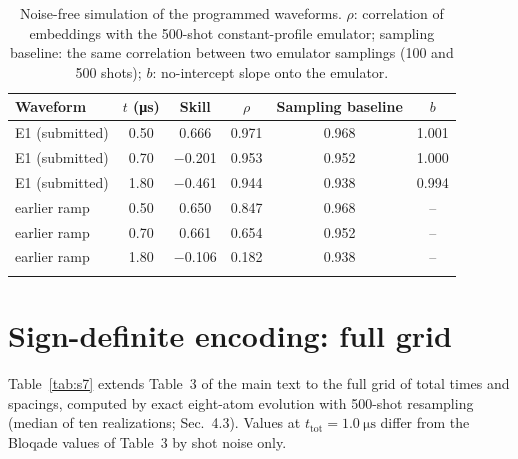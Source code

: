 \documentclass[pdflatex,sn-mathphys-num]{sn-jnl}
\begin{document}
\begin{table}[htb]
\caption{Noise-free simulation of the programmed waveforms. $\rho$: correlation of embeddings with the 500-shot constant-profile emulator; sampling baseline: the same correlation between two emulator samplings (100 and 500 shots); $b$: no-intercept slope onto the emulator.}\label{tab:s6}
\begin{tabular}{@{}lccccc@{}}
\toprule
Waveform & $t$ (\si{\micro\second}) & Skill & $\rho$ & Sampling baseline & $b$ \\
\midrule
E1 (submitted) & 0.50 & 0.666 & 0.971 & 0.968 & 1.001 \\
E1 (submitted) & 0.70 & $-$0.201 & 0.953 & 0.952 & 1.000 \\
E1 (submitted) & 1.80 & $-$0.461 & 0.944 & 0.938 & 0.994 \\
earlier ramp & 0.50 & 0.650 & 0.847 & 0.968 & -- \\
earlier ramp & 0.70 & 0.661 & 0.654 & 0.952 & -- \\
earlier ramp & 1.80 & $-$0.106 & 0.182 & 0.938 & -- \\
\botrule
\end{tabular}
\end{table}

\section{Sign-definite encoding: full grid}\label{sec:s7}

Table~\ref{tab:s7} extends Table~3 of the main text to the full grid of total times and spacings, computed by exact eight-atom evolution with 500-shot resampling (median of ten realizations; Sec.~4.3). Values at $t_{\mathrm{tot}}=\SI{1.0}{\micro\second}$ differ from the Bloqade values of Table~3 by shot noise only.
\end{document}
